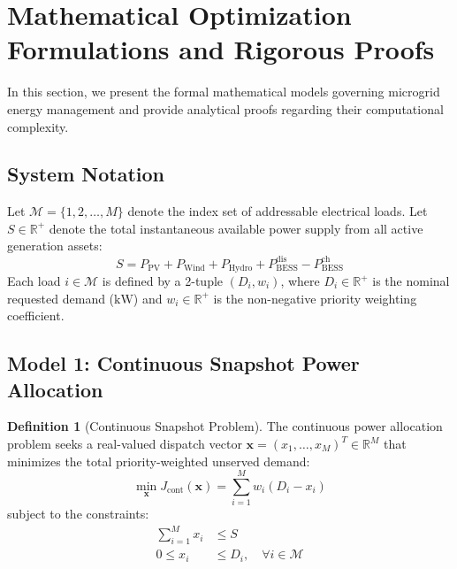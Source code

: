 \documentclass[11pt,a4paper]{article}
\theoremstyle{definition}
\newtheorem{definition}{Definition}
\theoremstyle{remark}
\begin{document}
\section{Mathematical Optimization Formulations and Rigorous Proofs}
\label{sec:math_formulations}

In this section, we present the formal mathematical models governing microgrid energy management and provide analytical proofs regarding their computational complexity.

\subsection{System Notation}
Let $\mathcal{M} = \{1, 2, \dots, M\}$ denote the index set of addressable electrical loads. Let $S \in \mathbb{R}^+$ denote the total instantaneous available power supply from all active generation assets:
\begin{equation}
S = P_{\text{PV}} + P_{\text{Wind}} + P_{\text{Hydro}} + P_{\text{BESS}}^{\text{dis}} - P_{\text{BESS}}^{\text{ch}}
\end{equation}
Each load $i \in \mathcal{M}$ is defined by a 2-tuple $(D_i, w_i)$, where $D_i \in \mathbb{R}^+$ is the nominal requested demand ($\text{kW}$) and $w_i \in \mathbb{R}^+$ is the non-negative priority weighting coefficient.

\subsection{Model 1: Continuous Snapshot Power Allocation}
\begin{definition}[Continuous Snapshot Problem]
The continuous power allocation problem seeks a real-valued dispatch vector $\mathbf{x} = (x_1, \dots, x_M)^T \in \mathbb{R}^M$ that minimizes the total priority-weighted unserved demand:
\begin{equation}
\min_{\mathbf{x}} J_{\text{cont}}(\mathbf{x}) = \sum_{i=1}^M w_i (D_i - x_i)
\label{eq:cont_prob}
\end{equation}
subject to the constraints:
\begin{align}
\sum_{i=1}^M x_i &\le S \label{eq:cont_cap} \\
0 \le x_i &\le D_i, \quad \forall i \in \mathcal{M} \label{eq:cont_bounds}
\end{align}
\end{definition}
\end{document}
